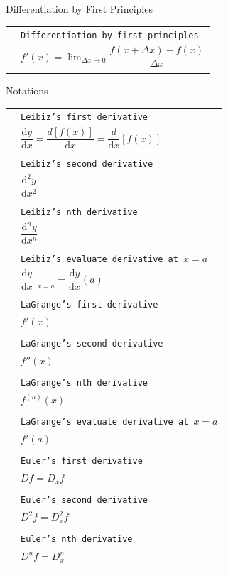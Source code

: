 \documentclass[10pt,landscape]{article}
\newcommand{\cRed}[1]{{\color{sthlmRed}{#1}}}
\newcommand{\dd}{\mathrm{d}}
\newcommand{\dx}{\mathrm{d}x}
\newcommand{\dy}{\mathrm{d}y}
\newcommand{\dydx}{\dfrac{\mathrm{d}y}{\mathrm{d}x}}
\begin{document}
\begin{multicols}{3}
\begin{mysection}{Differentiation by First Principles}
\begin{tabular}{@{}ll@{}}
\cRed{DFP}			& \texttt{Differentiation by first principles} \\
						& \qquad $f'(x) = \displaystyle \lim_{\Delta x \to 0} \dfrac{f(x+\Delta x) - f(x)}{\Delta x}$\\
						&
\end{tabular}
\end{mysection}

\begin{mysection}{Notations}

\begin{tabular}{@{}ll@{}}
						& \texttt{Leibiz's first derivative} \\
						& \qquad $\dfrac{\dy}{\dx} = \dfrac{d \left[f(x) \right]}{\dx}= \dfrac{d}{\dx} \left[f(x) \right]$\\
						& \\
						& \texttt{Leibiz's second derivative} \\
						& \qquad $\dfrac{\dd^{2}y}{\dx^{2}}$\\
						& \\
						& \texttt{Leibiz's nth derivative} \\
						& \qquad $\dfrac{\dd^{n}y}{\dx^{n}}$\\
						& \\
						& \texttt{Leibiz's evaluate derivative at $x=a$} \\
						& \qquad $\dydx\left.{\!\!\frac{}{}}\right|_{x=a} = \dydx(a)$\\
						& \\
						& \texttt{LaGrange's first derivative} \\
						& \qquad $f'(x)$\\
						& \\
						& \texttt{LaGrange's second derivative} \\
						& \qquad $f''(x)$\\
						& \\
						& \texttt{LaGrange's nth derivative} \\
						& \qquad $f^{(n)}(x)$\\
						& \\
						& \texttt{LaGrange's evaluate derivative at $x=a$} \\
						& \qquad $f'(a)$\\
						& \\
						& \texttt{Euler's first derivative} \\
						& \qquad $Df =D_{x}f $\\
						& \\
						& \texttt{Euler's second derivative} \\
						& \qquad $D^{2}f=D_{x}^{2}f$\\
						& \\
						& \texttt{Euler's nth derivative} \\
						& \qquad $D^{n}f= D_{x}^{n}$\\
						& \\
\end{tabular}


\end{mysection}
\end{multicols}
\end{document}
